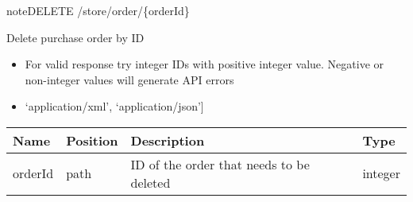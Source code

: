 \documentclass[letterpaper,10pt,english]{sphinxmanual}
\begin{document}
\begin{sphinxadmonition}{note}{DELETE /store/order/\{orderId\}}

Delete purchase order by ID\begin{itemize}
\item {} 
For valid response try integer IDs with positive integer value. Negative or non-integer values will generate API errors

\item {} 
\sphinxstylestrong{Produces: 
}{[}‘application/xml’, ‘application/json’{]}

\end{itemize}




\begin{savenotes}\sphinxattablestart
\centering
\begin{tabulary}{\linewidth}[t]{|T|T|T|T|}
\hline
\sphinxstyletheadfamily 
Name
&\sphinxstyletheadfamily 
Position
&\sphinxstyletheadfamily 
Description
&\sphinxstyletheadfamily 
Type
\\
\hline
orderId
&
path
&
ID of the order that needs to be deleted
&
integer
\\
\hline
\end{tabulary}
\par
\sphinxattableend\end{savenotes}



\end{sphinxadmonition}
\end{document}
